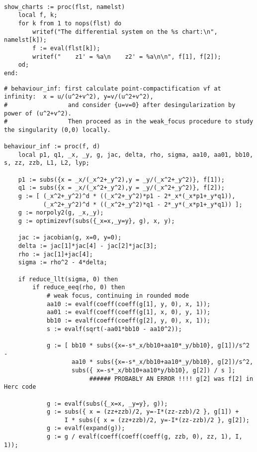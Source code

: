 \documentclass[a4paper,10pt]{article}
\begin{document}
\begin{lstlisting}[name=infinity]

show_charts := proc(flst, namelst)
    local f, k;
    for k from 1 to nops(flst) do
        writef("The differential system on the %s chart:\n", namelst[k]);
        f := eval(flst[k]);
        writef("    z1' = %a\n    z2' = %a\n\n", f[1], f[2]);
    od;
end:
\end{lstlisting}


\begin{lstlisting}[name=infinity]
# behaviour_inf: first calculate point-compactification vf at infinity:  x = u/(u^2+v^2), y=v/(u^2+v^2),
#                 and consider {u=v=0} after desingularization by power of (u^2+v^2).
#                 Then proceed as in the weak_focus procedure to study the singularity (0,0) locally.

behaviour_inf := proc(f, d)
    local p1, q1, _x, _y, g, jac, delta, rho, sigma, aa10, aa01, bb10, s, zz, zzb, L1, L2, lyp;

    p1 := subs({x = _x/(_x^2+_y^2),y = _y/(_x^2+_y^2)}, f[1]);
    q1 := subs({x = _x/(_x^2+_y^2),y = _y/(_x^2+_y^2)}, f[2]);
    g := [ (_x^2+_y^2)^d * ((_x^2+_y^2)*p1 - 2*_x*(_x*p1+_y*q1)),
           (_x^2+_y^2)^d * ((_x^2+_y^2)*q1 - 2*_y*(_x*p1+_y*q1)) ];
    g := norpoly2(g, _x,_y);
    g := optimizevf(subs({_x=x,_y=y}, g), x, y);

    jac := jacobian(g, x=0, y=0);
    delta := jac[1]*jac[4] - jac[2]*jac[3];
    rho := jac[1]+jac[4];
    sigma := rho^2 - 4*delta;

    if reduce_llt(sigma, 0) then
        if reduce_eeq(rho, 0) then
            # weak focus, continuing in rounded mode
            aa10 := evalf(coeff(coeff(g[1], y, 0), x, 1));
            aa01 := evalf(coeff(coeff(g[1], x, 0), y, 1));
            bb10 := evalf(coeff(coeff(g[2], y, 0), x, 1));
            s := evalf(sqrt(-aa01*bb10 - aa10^2));

            g := [ bb10 * subs({x=-s*_x/bb10+aa10*_y/bb10}, g[1])/s^2 -
                   aa10 * subs({x=-s*_x/bb10+aa10*_y/bb10}, g[2])/s^2,
                   subs({ x=-s*_x/bb10+aa10*y/bb10}, g[2]) / s ];
                        ###### PROBABLY AN ERROR !!!! g[2] was f[2] in Herc code

            g := evalf(subs({_x=x, _y=y}, g));
            g := subs({ x = (zz+zzb)/2, y=-I*(zz-zzb)/2 }, g[1]) +
                 I * subs({ x = (zz+zzb)/2, y=-I*(zz-zzb)/2 }, g[2]);
            g := evalf(expand(g));
            g := g / evalf(coeff(coeff(coeff(g, zzb, 0), zz, 1), I, 1));


\end{lstlisting}
\end{document}

